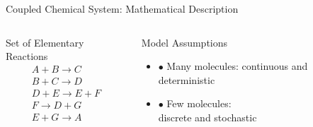 \documentclass{beamer}
\begin{document}
\begin{frame}{Coupled Chemical System: Mathematical Description}
  \begin{columns}
    \begin{column}{.45 \textwidth}
      \begin{block}{Set of Elementary Reactions}
        \begin{equation*}
          \begin{gathered}
            A + B \rightarrow C \\
            B + C \rightarrow D \\
            D + E \rightarrow E + F \\
            F \rightarrow D + G \\
            E + G \rightarrow A   
          \end{gathered}
        \end{equation*}
      \end{block}
    \end{column}
    \begin{column}{.45 \textwidth}
      \begin{block}{Model Assumptions}
        \begin{itemize}
        \item $\bullet$ Many molecules: continuous and deterministic
        \item $\bullet$ Few molecules:\\ discrete and stochastic
        \end{itemize}
      \end{block}
    \end{column}
  \end{columns}
\end{frame}
\end{document}
